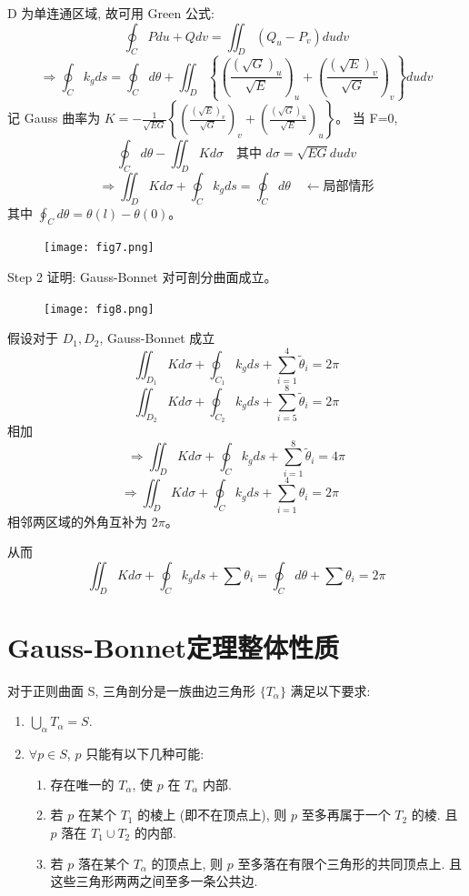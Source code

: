 \documentclass[lang=cn,10pt,thmcnt=section]{elegantbook}
\begin{document}
D 为单连通区域, 故可用 Green 公式:
$$ \oint_C P du + Q dv = \iint_D (Q_u - P_v) du dv $$
$$ \Rightarrow \oint_C k_g ds = \oint_C d\theta + \iint_D \left\{ \left( \frac{(\sqrt{G})_u}{\sqrt{E}} \right)_u + \left( \frac{(\sqrt{E})_v}{\sqrt{G}} \right)_v \right\} du dv $$
记 Gauss 曲率为 $K = -\frac{1}{\sqrt{EG}} \left\{ \left( \frac{(\sqrt{E})_v}{\sqrt{G}} \right)_v + \left( \frac{(\sqrt{G})_u}{\sqrt{E}} \right)_u \right\}$。
当 F=0,
$$ \oint_C d\theta - \iint_D K d\sigma \quad \text{其中 } d\sigma = \sqrt{EG} du dv $$
$$ \Rightarrow \iint_D K d\sigma + \oint_C k_g ds = \oint_C d\theta \quad \leftarrow \text{局部情形} $$
其中 $\oint_C d\theta = \theta(l) - \theta(0)$。

\begin{figure}[h]
    \centering
    \texttt{[image: fig7.png]} %
\end{figure}


Step 2 证明: Gauss-Bonnet 对可剖分曲面成立。

\begin{figure}[h]
    \centering
    \texttt{[image: fig8.png]} %
\end{figure}


假设对于 $D_1, D_2$, Gauss-Bonnet 成立
$$ \iint_{D_1} K d\sigma + \oint_{C_1} k_g ds + \sum_{i=1}^{4} \tilde{\theta}_i = 2\pi $$
$$ \iint_{D_2} K d\sigma + \oint_{C_2} k_g ds + \sum_{i=5}^{8} \tilde{\theta}_i = 2\pi $$
相加
$$ \Rightarrow \iint_{D} K d\sigma + \oint_{C} k_g ds + \sum_{i=1}^{8} \tilde{\theta}_i = 4\pi $$
$$ \Rightarrow \iint_{D} K d\sigma + \oint_{C} k_g ds + \sum_{i=1}^{4} \theta_i = 2\pi \quad  $$
相邻两区域的外角互补为 $2\pi$。

从而
$$ \iint_D K d\sigma + \oint_C k_g ds + \sum \theta_i = \oint_C d\theta + \sum \theta_i = 2\pi $$
\section{Gauss-Bonnet定理整体性质}
\begin{definition}[三角剖分]
    对于正则曲面 S, 三角剖分是一族曲边三角形 $\{T_\alpha\}$ 满足以下要求:
\begin{enumerate}
    \item $\bigcup_{\alpha} T_\alpha = S$.
    \item $\forall p \in S$, $p$ 只能有以下几种可能:
    \begin{enumerate}
        \item 存在唯一的 $T_\alpha$, 使 $p$ 在 $T_\alpha$ 内部.
        
        \item 若 $p$ 在某个 $T_1$ 的棱上 (即不在顶点上), 则 $p$ 至多再属于一个 $T_2$ 的棱. 且 $p$ 落在 $T_1 \cup T_2$ 的内部.
        
        \item 若 $p$ 落在某个 $T_\alpha$ 的顶点上, 则 $p$ 至多落在有限个三角形的共同顶点上. 且这些三角形两两之间至多一条公共边.
        
    \end{enumerate}
\end{enumerate}

\end{definition}
\end{document}
